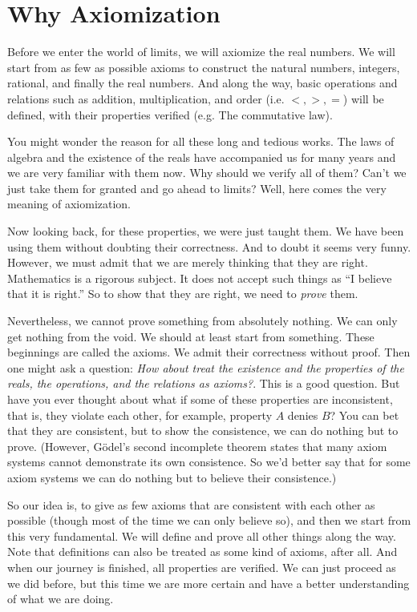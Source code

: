 \part*{Why Axiomization}
Before we enter the world of limits, we will axiomize the real numbers. We will start from as few as possible  
axioms to construct the natural numbers, integers, rational, and finally the real numbers. And along the way, 
basic operations and relations such as addition, multiplication, and order (i.e. $<,>,=$) will be defined, with 
their properties verified (e.g. The commutative law).

You might wonder the reason for all these long and tedious works. The laws of algebra and the existence of the 
reals have accompanied us for many years and we are very familiar with them now. Why should we verify all of 
them? Can't we just take them for granted and go ahead to limits? Well, here comes the very meaning of 
axiomization.

Now looking back, for these properties, we were just taught them. We have been using them without doubting their 
correctness. And to doubt it seems very funny. However, we must admit that we are merely thinking that they are 
right. Mathematics is a rigorous subject. It does not accept such things as ``I believe that it is right.'' So to 
show that they are right, we need to \emph{prove} them.

Nevertheless, we cannot prove something from absolutely nothing. We can only get nothing from the void. We should 
at least start from something. These beginnings are called the axioms. We admit their correctness without proof. 
Then one might ask a question: \emph{How about treat the existence and the properties of the reals, the 
operations, and the relations as axioms?}. This is a good question. But have you ever thought about what if some 
of these properties are inconsistent, that is, they violate each other, for example, property $A$ denies $B$? You 
can bet that they are consistent, but to show the consistence, we can do nothing but to prove. (However, G\"odel's 
second incomplete theorem states that many axiom systems cannot demonstrate its own consistence. So we'd better say
that for some axiom systems we can do nothing but to believe their consistence.)

So our idea is, to give as few axioms that are consistent with each other as possible (though most of the time we 
can only believe so), and then we start from this very fundamental. We will define and prove all other things 
along the way. Note that definitions can also be treated as some kind of axioms, after all. And when our journey 
is finished, all properties are verified. We can just proceed as we did before, but this time we are more certain 
and have a better understanding of what we are doing.